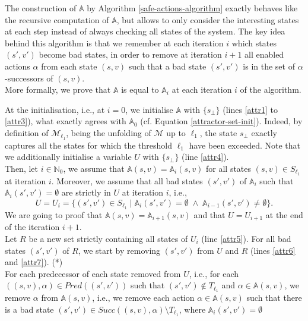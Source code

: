 \begin{proof2}
The construction of $\mathbb{A}$ by Algorithm \ref{safe-actions-algorithm} exactly behaves like the recursive computation of $\mathbb{A}$, but allows to only consider the interesting states at each step instead of always checking all states of the system.
The key idea behind this algorithm is that we remember at each iteration $i$ which states $(s',v')$ become bad states, in order to remove at iteration $i+1$ all enabled actions $\alpha$ from each state $(s, v)$ such that a bad state $(s', v')$ is in the set of $\alpha$-successors of $(s, v)$. \\
More formally, we prove that $\mathbb{A}$ is equal to $\mathbb{A}_i$ at each iteration $i$ of the algorithm.
\par At the initialisation, i.e., at $i=0$,
we initialise $\mathbb{A}$ with $\{s_\bot\}$ (lines \ref{attr1} to \ref{attr3}), what exactly agrees with $\mathbb{A}_0$ (cf. Equation \ref{attractor-set-init}).
Indeed, by definition of $\mathcal{M}_{\ell_1}$, being the unfolding of $\mathcal{M}$ up to $\ell_1$, the state $s_\bot$ exactly captures all the states for which the threshold $\ell_1$ have been exceeded.
Note that we additionally initialise a variable $U$ with $\{s_\bot\}$ (line \ref{attr4}).\\
Then, let $i \in \mathbb{N}_0$, we assume that $\mathbb{A}(s, v) = \mathbb{A}_i(s, v)$ for all states $(s, v) \in S_{\ell_1}$ at iteration $i$.
Moreover, we assume that all bad states $(s', v')$ of $\mathbb{A}_i$ such that $\mathbb{A}_i(s', v')=\emptyset$ are strictly in $U$ at iteration $i$, i.e., \[U = U_i = \{(s', v') \in S_{\ell_1} \; | \; \mathbb{A}_i(s', v') = \emptyset \; \wedge \; \mathbb{A}_{i-1}(s', v') \neq \emptyset \}.\]
We are going to proof that $\mathbb{A}(s, v) = \mathbb{A}_{i+1}(s, v)$ and that $U = U_{i+1}$ at the end of the iteration $i+1$.\\
Let $R$ be a new set strictly containing all states of $U_i$ (line \ref{attr5}).
For all bad states $(s', v')$ of $R$, we start by removing $(s', v')$ from $U$ and $R$ (lines \ref{attr6} and \ref{attr7}).  {\color{umons-red}(*)}\\
For each predecessor of each state removed from $U$, i.e., for each $((s, v), \alpha) \in Pred((s', v'))$ such that $(s', v') \not \in T_{\ell_1}$ and $\alpha \in \mathbb{A}(s, v)$, we remove $\alpha$ from $\mathbb{A}(s, v)$, i.e., we remove each action $\alpha \in \mathbb{A}(s, v)$ such that there is a bad state $(s', v') \in Succ((s, v), \alpha) \setminus T_{\ell_1}$, where $\mathbb{A}_i(s', v') = \emptyset$

\end{proof2}
